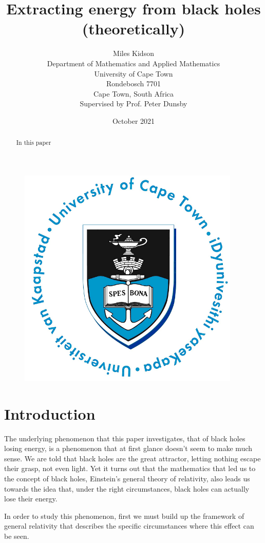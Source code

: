 \documentclass[11pt]{article}
\numberwithin{equation}{section}
\numberwithin{figure}{section}
\numberwithin{table}{section}
\begin{document}
\title{Extracting energy from black holes (theoretically)}
\author{Miles Kidson \\ Department of Mathematics and Applied Mathematics \\ University of Cape Town \\ Rondebosch 7701 \\ Cape Town, South Africa \\ Supervised by Prof. Peter Dunsby }
\date{October 2021}

\maketitle

\begin{figure}[h]
    \begin{center}
        \includegraphics{Plots/UCT.jpg}
    \end{center}
\end{figure}


\begin{center}
    \begin{abstract}
        In this paper
    \end{abstract}
\end{center}

\newpage
\section{Introduction}\label{sec:Introduction}
\par The underlying phenomenon that this paper investigates, that of black holes losing energy, is a phenomenon that at first glance doesn't seem to make much sense. We are told that black holes are the great attractor, letting nothing escape their grasp, not even light. Yet it turns out that the mathematics that led us to the concept of black holes, Einstein's general theory of relativity, also leads us towards the idea that, under the right circumstances, black holes can actually lose their energy. 
\par In order to study this phenomenon, first we must build up the framework of general relativity that describes the specific circumstances where this effect can be seen. 
\end{document}
